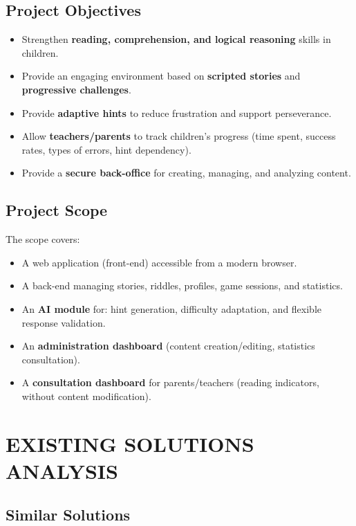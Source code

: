 \documentclass[12pt,a4paper]{article}
\begin{document}
\subsection{Project Objectives}

\begin{itemize}
    \item Strengthen \textbf{reading, comprehension, and logical reasoning} skills in children.
    \item Provide an engaging environment based on \textbf{scripted stories} and \textbf{progressive challenges}.
    \item Provide \textbf{adaptive hints} to reduce frustration and support perseverance.
    \item Allow \textbf{teachers/parents} to track children's progress (time spent, success rates, types of errors, hint dependency).
    \item Provide a \textbf{secure back-office} for creating, managing, and analyzing content.
\end{itemize}

\subsection{Project Scope}

The scope covers:
\begin{itemize}
    \item A web application (front-end) accessible from a modern browser.
    \item A back-end managing stories, riddles, profiles, game sessions, and statistics.
    \item An \textbf{AI module} for: hint generation, difficulty adaptation, and flexible response validation.
    \item An \textbf{administration dashboard} (content creation/editing, statistics consultation).
    \item A \textbf{consultation dashboard} for parents/teachers (reading indicators, without content modification).
\end{itemize}
\newpage

\section{EXISTING SOLUTIONS ANALYSIS}

\subsection{Similar Solutions}
\end{document}
